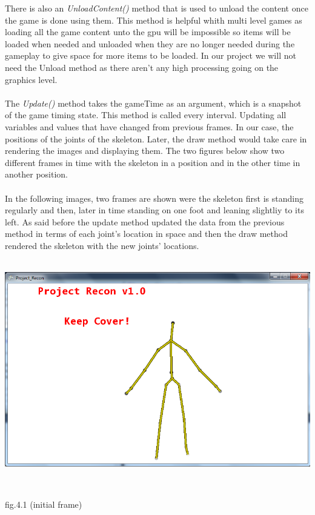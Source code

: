 \documentclass[11pt]{article} %
\begin{document}
There is also an \emph{UnloadContent()} method that is used to unload the content once the game is done using them. This method is helpful whith multi level games as loading all the game content unto the gpu will be impossible so items will be loaded when needed and unloaded when they are no longer needed during the gameplay to give space for more items to be loaded. In our project we will not need the Unload method as there aren't any high processing going on the graphics level.
\\
\\
The \emph{Update()} method takes the gameTime as an argument, which is a snapshot of the game timing state. This method is called every interval. Updating all variables and values that have changed from previous frames. In our case, the positions of the joints of the skeleton. Later, the draw method would take care in rendering the images and displaying them. The two figures below show two different frames in time with the skeleton in a position and in the other time in another position.
\\
\\
In the following images, two frames are shown were the skeleton first is standing regularly and then, later in time standing on one foot and leaning slightliy to its left. As said before the update method updated the data from the previous method in terms of each joint's location in space and then the draw method rendered the skeleton with the new joints' locations. 
\\
\\
\centerline{\includegraphics[scale=0.5]{skeleton_frame1.png}}
\\
\centerline{fig.4.1 (initial frame)}
\\
\end{document}
